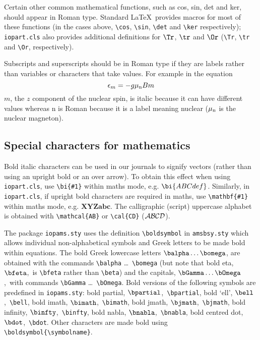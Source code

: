 Certain other common mathematical functions, such as cos, sin, det and
ker, should appear in Roman type. Standard \LaTeX\ provides macros for
most of these functions
(in the cases above, \verb"\cos", \verb"\sin", \verb"\det" and \verb"\ker"
respectively); \verb"iopart.cls" also provides
additional definitions for $\Tr$, $\tr$ and
$\Or$ (\verb"\Tr", \verb"\tr" and \verb"\Or", respectively).

Subscripts and superscripts should be in Roman type if they are labels
rather than variables or characters that take values. For example in the
equation
\[
\epsilon_m=-g\mu_{\rm n}Bm
\]
$m$, the $z$ component of the nuclear spin, is italic because it can have
different values whereas n is Roman because it
is a label meaning nuclear ($\mu_{\rm n}$
is the nuclear magneton).

\subsection{Special characters for mathematics}
Bold italic characters can be used in our journals to signify vectors
(rather than using an upright bold or an over arrow). To obtain this
effect when using \verb"iopart.cls", use \verb"\bi{#1}" within maths
mode, e.g. $\bi{ABCdef}$. Similarly, in \verb"iopart.cls", if upright
bold characters are required in maths, use \verb"\mathbf{#1}" within
maths mode, e.g. $\mathbf{XYZabc}$. The calligraphic (script) uppercase
alphabet is obtained with \verb"\mathcal{AB}" or \verb"\cal{CD}"
($\mathcal{AB}\cal{CD}$).


The package \verb"iopams.sty" uses the definition \verb"\boldsymbol" in \verb"amsbsy.sty"
which allows individual non-alphabetical symbols and Greek letters to be
made bold within equations.
The bold Greek lowercase letters \ifiopams$\balpha \ldots\bomega$,\fi
are obtained with the commands
\verb"\balpha" \dots\ \verb"\bomega" (but note that
bold eta\ifiopams, $\bfeta$,\fi\ is \verb"\bfeta" rather than \verb"\beta")
and the capitals\ifiopams, $\bGamma\ldots\bOmega$,\fi\ with commands
\verb"\bGamma" \dots\
\verb"\bOmega". Bold versions of the following symbols are
predefined in \verb"iopams.sty":
bold partial\ifiopams, $\bpartial$,\fi\ \verb"\bpartial",
bold `ell'\ifiopams, $\bell$,\fi\  \verb"\bell",
bold imath\ifiopams, $\bimath$,\fi\  \verb"\bimath",
bold jmath\ifiopams, $\bjmath$,\fi\  \verb"\bjmath",
bold infinity\ifiopams, $\binfty$,\fi\ \verb"\binfty",
bold nabla\ifiopams, $\bnabla$,\fi\ \verb"\bnabla",
bold centred dot\ifiopams, $\bdot$,\fi\  \verb"\bdot". Other
characters are made bold using
\verb"\boldsymbol{\symbolname}".

